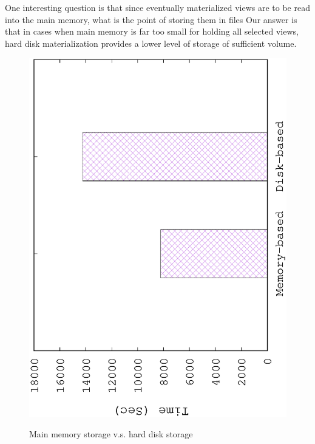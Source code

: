 	One interesting question is that since eventually materialized views are to be read into the main memory, what is the point of storing them in files Our answer is that in cases when main memory is far too small for holding all selected views, hard disk materialization provides a lower level of storage of sufficient volume.
	
	\begin{figure}[H]
		\centering
		\includegraphics[scale=0.5, angle=270]{plot/disk.eps}
		\label{fig:disk}
		\caption{Main memory storage v.s. hard disk storage}
	\end{figure}
	
